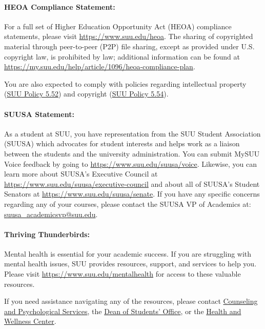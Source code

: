 \documentclass[12pt, letterpaper]{article}
\begin{document}
\paragraph{HEOA Compliance Statement:}
For a full set of Higher Education Opportunity Act (HEOA) compliance statements, please visit \href{https://www.suu.edu/heoa}{https://www.suu.edu/heoa}. The sharing of copyrighted material through peer-to-peer (P2P) file sharing, except as provided under U.S. copyright law, is prohibited by law; additional information can be found at \newline\href{https://my.suu.edu/help/article/1096/heoa-compliance-plan}{https://my.suu.edu/help/article/1096/heoa-compliance-plan}.

\noindent
You are also expected to comply with policies regarding intellectual property (\href{https://www.suu.edu/policies/05/52.html}{SUU Policy 5.52}) and copyright (\href{https://www.suu.edu/policies/05/54.html}{SUU Policy 5.54}).

\paragraph{SUUSA Statement:}
As a student at SUU, you have representation from the SUU Student Association (SUUSA) which advocates for student interests and helps work as a liaison between the students and the university administration. You can submit MySUU Voice feedback by going to \href{https://www.suu.edu/suusa/voice}{https://www.suu.edu/suusa/voice}. Likewise, you can learn more about SUUSA’s Executive Council at \href{https://www.suu.edu/suusa/executive-council}{https://www.suu.edu/suusa/executive-council} and about all of SUUSA’s Student Senators at \href{https://www.suu.edu/suusa/senate}{https://www.suu.edu/suusa/senate}. If you have any specific concerns regarding any of your courses, please contact the SUUSA VP of Academics at: \href{suusa_academicsvp@suu.edu}{suusa\_\ignorespaces academicsvp@suu.edu}.

\paragraph{Thriving Thunderbirds:}
Mental health is essential for your academic success. If you are struggling with mental health issues, SUU provides resources, support, and services to help you. Please visit \href{https://www.suu.edu/mentalhealth}{https://www.suu.edu/mentalhealth} for access to these valuable resources.

\noindent
If you need assistance navigating any of the resources, please contact \href{https://www.suu.edu/caps/}{Counseling and Psychological Services}, the \href{https://www.suu.edu/deanofstudents/}{Dean of Students’ Office}, or the \href{https://www.suu.edu/health/}{Health and Wellness Center}.
\end{document}
